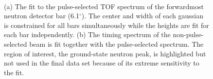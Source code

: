 \begin{figure}[!hbp]
\centering
{}\\
\caption[Functional fit to the pulse-selected timing spectrum.]{(a) The fit to the pulse-selected TOF spectrum of the forwardmost neutron detector bar (6.1$^{\circ}$).  The center and width of each gaussian is constrained for all bars simultaneously while the heights are fit for each bar independently.  (b) The timing spectrum of the non-pulse-selected beam is fit together with the pulse-selected spectrum.  The region of interest, the ground-state neutron peak, is highlighted but not used in the final data set because of its extreme sensitivity to the fit.}
\label{fig:continuumModel}
\end{figure}

